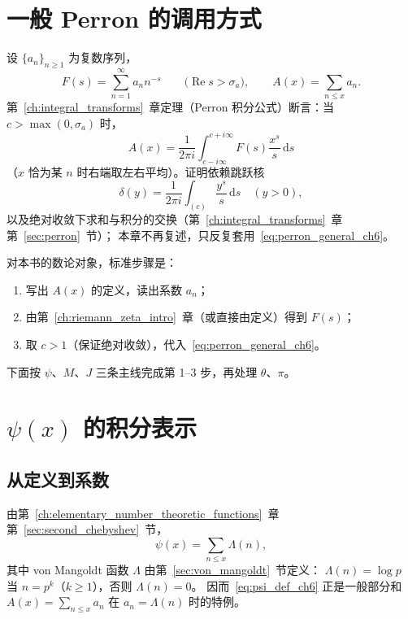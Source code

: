 \section{一般 Perron 的调用方式}
\label{sec:working_framework}

设 $\{a_n\}_{n\ge 1}$ 为复数序列，
\[
  F(s)=\sum_{n=1}^{\infty}a_n n^{-s}
  \qquad\bigl(\operatorname{Re}s>\sigma_a\bigr),
  \qquad
  A(x)=\sum_{n\le x}a_n.
\]
第~\ref{ch:integral_transforms}~章定理（Perron 积分公式）断言：当 $c>\max(0,\sigma_a)$ 时，
\begin{equation}
  A(x)
  =\frac{1}{2\pi i}\int_{c-i\infty}^{c+i\infty} F(s)\frac{x^s}{s}\,\mathrm{d}s
  \label{eq:perron_general_ch6}
\end{equation}
（$x$ 恰为某 $n$ 时右端取左右平均）。证明依赖跳跃核
\[
  \delta(y)=\frac{1}{2\pi i}\int_{(c)}\frac{y^s}{s}\,\mathrm{d}s
  \quad(y>0),
\]
以及绝对收敛下求和与积分的交换（第~\ref{ch:integral_transforms}~章第~\ref{sec:perron}~节）；
本章不再复述，只反复套用~\eqref{eq:perron_general_ch6}。

对本书的数论对象，标准步骤是：
\begin{enumerate}
  \item 写出 $A(x)$ 的定义，读出系数 $a_n$；
  \item 由第~\ref{ch:riemann_zeta_intro}~章（或直接由定义）得到 $F(s)$；
  \item 取 $c>1$（保证绝对收敛），代入~\eqref{eq:perron_general_ch6}。
\end{enumerate}

下面按 $\psi$、$M$、$J$ 三条主线完成第 1--3 步，再处理 $\theta$、$\pi$。


\section{\texorpdfstring{$\psi(x)$}{psi(x)} 的积分表示}
\label{sec:psi_integral}

\subsection{从定义到系数}

由第~\ref{ch:elementary_number_theoretic_functions}~章第~\ref{sec:second_chebyshev}~节，
\begin{equation}
  \psi(x)=\sum_{n\le x}\Lambda(n),
  \label{eq:psi_def_ch6}
\end{equation}
其中 von Mangoldt 函数 $\Lambda$ 由第~\ref{sec:von_mangoldt}~节定义：
$\Lambda(n)=\log p$ 当 $n=p^k$（$k\ge 1$），否则 $\Lambda(n)=0$。
因而~\eqref{eq:psi_def_ch6} 正是一般部分和 $A(x)=\sum_{n\le x}a_n$ 在
$a_n=\Lambda(n)$ 时的特例。

